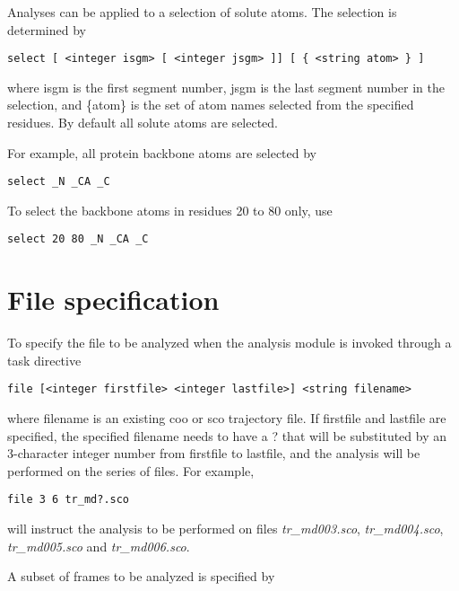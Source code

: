 Analyses can be applied to a selection of solute atoms. The selection
is determined by

\begin{verbatim}
select [ <integer isgm> [ <integer jsgm> ]] [ { <string atom> } ]
\end{verbatim}

where {\rm isgm} is the first segment number, {\rm jsgm} is the last 
segment number in the selection, and {\rm \{atom\}} is the set of atom
names selected from the specified residues. By default all solute
atoms are selected.
\par
For example, all protein backbone atoms are selected by

\begin{verbatim}
select _N _CA _C
\end{verbatim}

To select the backbone atoms in residues 20 to 80 only, use

\begin{verbatim}
select 20 80 _N _CA _C
\end{verbatim}

\section{File specification}

To specify the file to be analyzed when the analysis module is
invoked through a task directive

\begin{verbatim}
file [<integer firstfile> <integer lastfile>] <string filename>
\end{verbatim}

where {\rm filename} is an existing {\rm coo} or {\rm sco} trajectory file.
If {\rm firstfile} and {\rm lastfile} are specified, the specified
{\rm filename} needs to have a {\rm ?} that will be substituted by
an 3-character integer number from {\rm firstfile} to {\rm lastfile},
and the analysis will be performed on the series of files.
For example,

\begin{verbatim}
file 3 6 tr_md?.sco
\end{verbatim}

will instruct the analysis to be performed on files {\it tr\_md003.sco},
{\it tr\_md004.sco}, {\it tr\_md005.sco} and {\it tr\_md006.sco}.

\par
A subset of frames to be analyzed is specified by

